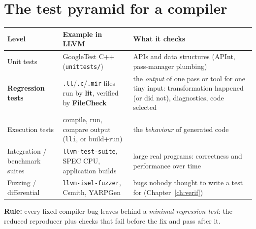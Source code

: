 \documentclass[10pt,a4paper,openany,oneside]{report}
\newcommand{\prio}[1]{\texorpdfstring{\ifcase#1\or{\color{gold}\ding{72}}\or{\color{gold}\ding{72}\ding{72}}\or{\color{gold}\ding{72}\ding{72}\ding{72}}\fi}{}}
\begin{document}
\section{The test pyramid for a compiler \prio{2}}
\begin{center}\small
\begin{xltabular}{\textwidth}{@{}L{3.6cm}L{3.8cm}Y@{}}
\toprule
\textbf{Level} & \textbf{Example in LLVM} & \textbf{What it checks}\\
\midrule\endhead
Unit tests & GoogleTest C++ (\texttt{unittests/}) & APIs and data structures (APInt, pass-manager plumbing)\\
\textbf{Regression tests} & \texttt{.ll}/\texttt{.c}/\texttt{.mir} files run by \textbf{lit}, verified by \textbf{FileCheck} & the \emph{output} of one pass or tool for one tiny input: transformation happened (or did not), diagnostics, code selected\\
Execution tests & compile, run, compare output (\texttt{lli}, or build+run) & the \emph{behaviour} of generated code\\
Integration / benchmark suites & \texttt{llvm-test-suite}, SPEC CPU, application builds & large real programs: correctness and performance over time\\
Fuzzing / differential & \texttt{llvm-isel-fuzzer}, Csmith, YARPGen & bugs nobody thought to write a test for (Chapter~\ref{ch:verif})\\
\bottomrule
\end{xltabular}
\end{center}
\textbf{Rule:} every fixed compiler bug leaves behind a \emph{minimal regression test}: the reduced reproducer plus checks that fail before the fix and pass after it.
\end{document}

